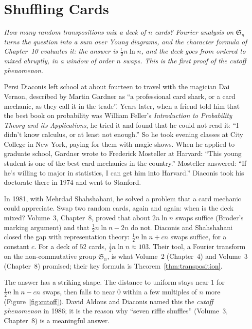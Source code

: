 \chapter{Shuffling Cards}

\begin{center}\itshape
How many random transpositions mix a deck of $n$ cards? Fourier analysis on $\mathfrak S_n$ turns the question into a sum over Young diagrams, and the character formula of Chapter~10 evaluates it: the answer is $\frac12n\ln n$, and the deck goes from ordered to
mixed abruptly, in a window of order $n$ swaps. This is the first proof of the cutoff phenomenon.
\end{center}

Persi Diaconis left school at about fourteen to travel with the magician Dai Vernon, described by Martin Gardner as ``a professional card shark, or a card mechanic, as they call it in the trade''. Years later, when a friend told him that the best book
on probability was William Feller's \emph{Introduction to Probability Theory and its Applications}, he tried it and found that he could not read it: ``I didn't know calculus, or at least not enough.'' So he took evening classes at City College in New York, paying
for them with magic shows. When he applied to graduate school, Gardner wrote to Frederick Mosteller at Harvard: ``This young student is one of the best card mechanics in the country.'' Mosteller answered: ``If he's willing to major in statistics, I can get him into
Harvard.'' Diaconis took his doctorate there in 1974 and went to Stanford.

In 1981, with Mehrdad Shahshahani, he solved a problem that a card mechanic could appreciate. Swap two random cards, again and again: when is the deck mixed? Volume~3, Chapter~8, proved that about $2n\ln n$ swaps suffice (Broder's marking argument) and
that $\frac12n\ln n-2n$ do not. Diaconis and Shahshahani closed the gap with representation theory: $\frac12n\ln n+cn$ swaps suffice, for a constant $c$. For a deck of $52$ cards, $\frac12n\ln n\approx103$. Their tool, a Fourier transform on the non-commutative
group $\mathfrak S_n$, is what Volume~2 (Chapter~4) and Volume~3 (Chapter~8) promised; their key formula is Theorem~\ref{thm:transposition}.

The answer has a striking shape. The distance to uniform stays near $1$ for $\frac12n\ln n-cn$ swaps, then falls to near $0$ within a few multiples of $n$ more (Figure~\ref{fig:cutoff}). David Aldous and Diaconis named this the \emph{cutoff phenomenon} in 1986; it
is the reason why ``seven riffle shuffles'' (Volume~3, Chapter~8) is a meaningful answer.

